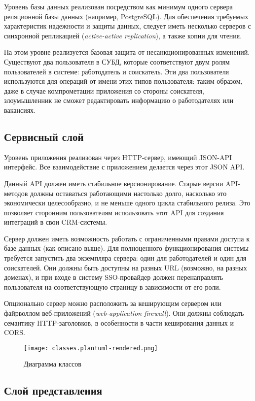 \documentclass[a4page]{article}
\begin{document}
Уровень базы данных реализован посредством как минимум
одного сервера реляционной базы данных (например, PostgreSQL).
Для обеспечения требуемых характеристик надежности и защиты данных,
следует иметь несколько серверов с синхронной репликацией (\textit{active-active replication}),
а также копии для чтения.

На этом уровне реализуется базовая защита от несанкционированных изменений.
Существуют два пользователя в СУБД, которые соответствуют двум ролям пользователей в системе: работодатель и соискатель.
Эти два пользователя используются для операций от имени этих типов пользователя:
таким образом, даже в случае компрометации приложения со стороны соискателя,
злоумышленник не сможет редактировать информацию о работодателях или вакансиях.

\subsection{Сервисный слой}

Уровень приложения реализован через HTTP-сервер, имеющий JSON-API интерфейс.
Все взаимодействие с приложением делается через этот JSON API.

Данный API должен иметь стабильное версионирование.
Старые версии API-методов должны оставаться работающими
настолько долго, насколько это экономически целесообразно,
и не меньше одного цикла стабильного релиза.
Это позволяет сторонним пользователям использовать этот API
для создания интеграций в свои CRM-системы.

Сервер должен иметь возможность работать с ограниченными правами доступа к базе данных
(как описано выше).
Для полноценного функционирования системы требуется запустить два экземпляра сервера:
один для работодателей и один для соискателей.
Они должны быть доступны на разных URL
(возможно, на разных доменах),
и при входе в систему SSO-провайдер должен
перенаправлять пользователя на соответствующую страницу в зависимости от его роли.

Опционально сервер можно расположить за кеширующим сервером
или файрволлом веб-приложений (\textit{web-application firewall}).
Они должны соблюдать семантику HTTP-заголовков, в особенности в части кеширования данных и CORS.

\begin{figure}[H]
  \centering
  \texttt{[image: classes.plantuml-rendered.png]}
  \caption{Диаграмма классов}
\end{figure}

\subsection{Слой представления}
\end{document}
